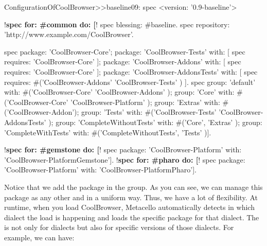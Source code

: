 \documentclass[a4paper,10pt,twoside]{book}
\begin{document}
\begin{code}{}
ConfigurationOfCoolBrowser>>baseline09: spec
      <version: '0.9-baseline'>

      !\textbf{spec for: \#common do: [}!
            spec blessing: #baseline.
            spec repository: 'http://www.example.com/CoolBrowser'.

            spec
                  package: 'CoolBrowser-Core';
                  package: 'CoolBrowser-Tests' with: [ spec requires: 'CoolBrowser-Core' ];
                  package: 'CoolBrowser-Addons' with: [ spec requires: 'CoolBrowser-Core' ];
                  package: 'CoolBrowser-AddonsTests' with: [
                        spec requires: #('CoolBrowser-Addons' 'CoolBrowser-Tests' ) ].
            spec
                  group: 'default' with: #('CoolBrowser-Core' 'CoolBrowser-Addons' );
                  group: 'Core' with: #('CoolBrowser-Core' 'CoolBrowser-Platform' );
                  group: 'Extras' with: #('CoolBrowser-Addon');
                  group: 'Tests' with: #('CoolBrowser-Tests' 'CoolBrowser-AddonsTests' );
                  group: 'CompleteWithoutTests' with: #('Core', 'Extras' );
                  group: 'CompleteWithTests' with: #('CompleteWithoutTests', 'Tests' )].

      !\textbf{spec for: \#gemstone do: [}!
            spec package: 'CoolBrowser-Platform' with: 'CoolBrowser-PlatformGemstone'].
      !\textbf{spec for: \#pharo do: [}!
            spec package: 'CoolBrowser-Platform' with: 'CoolBrowser-PlatformPharo'].
\end{code}

Notice that we add the package  in the  group. As you can see, we can manage this package as any other and in a uniform way. Thus, we have a lot of flexibility. At runtime, when you load CoolBrowser, Metacello automatically detects in which dialect the load is happening and loads the specific package for that dialect. The  is not only for dialects but also for specific versions of those dialects. For example, we can have:
\end{document}
